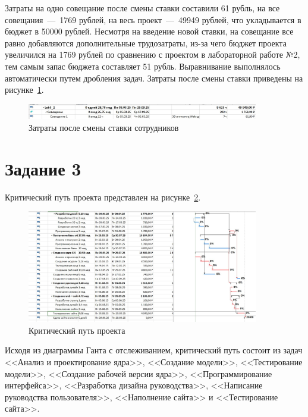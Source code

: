Затраты на одно совещание после смены ставки составили 61 рубль, на все совещания~---~1769 рублей, на весь проект~---~49949 рублей, что укладывается в бюджет в 50000 рублей.
Несмотря на введение новой ставки, на совещание все равно добавляются дополнительные трудозатраты, из-за чего бюджет проекта увеличился на 1769 рублей по сравнению с проектом в лабораторной работе №2, тем самым запас бюджета составляет 51 рубль.
Выравнивание выполнялось автоматически путем дробления задач.
Затраты после смены ставки приведены на рисунке~\ref{fig:screen2_5}.

\begin{figure}[H]
	\centering
	\includegraphics[width=0.9\textwidth]{img/task2/screen5.jpg}
	\caption{Затраты после смены ставки сотрудников}
	\label{fig:screen2_5}
\end{figure}

\section{Задание 3}

Критический путь проекта представлен на рисунке~\ref{fig:screen3_1}.

\begin{figure}[H]
	\centering
	\includegraphics[width=0.9\textwidth]{img/task3/screen1.jpg}
	\caption{Критический путь проекта}
	\label{fig:screen3_1}
\end{figure}

Исходя из диаграммы Ганта с отслеживанием, критический путь состоит из задач <<Анализ и проектирование ядра>>, <<Создание модели>>, <<Тестирование модели>>, <<Создание рабочей версии ядра>>, <<Программирование интерфейса>>, <<Разработка дизайна руководства>>, <<Написание руководства пользователя>>, <<Наполнение сайта>> и <<Тестирование сайта>>.

